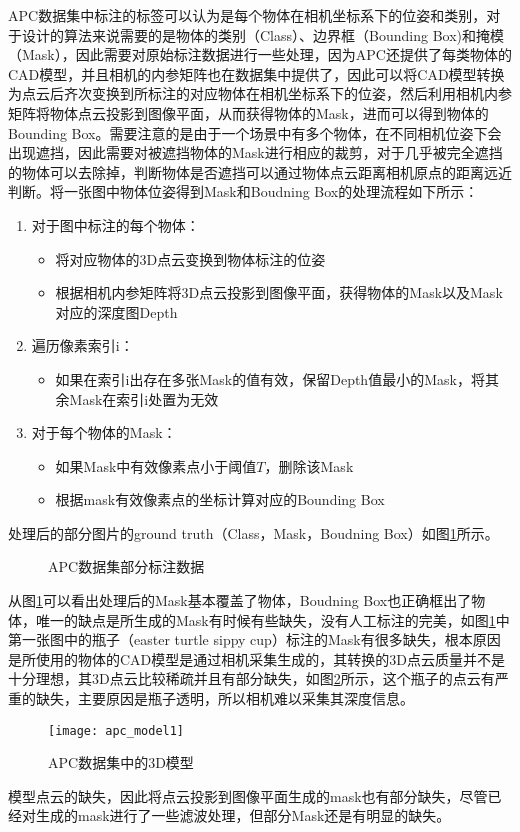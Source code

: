 APC数据集中标注的标签可以认为是每个物体在相机坐标系下的位姿和类别，对于设计的算法来说需要的是物体的类别（Class）、边界框（Bounding Box)和掩模（Mask），因此需要对原始标注数据进行一些处理，因为APC还提供了每类物体的CAD模型，并且相机的内参矩阵也在数据集中提供了，因此可以将CAD模型转换为点云后齐次变换到所标注的对应物体在相机坐标系下的位姿，然后利用相机内参矩阵将物体点云投影到图像平面，从而获得物体的Mask，进而可以得到物体的Bounding Box。需要注意的是由于一个场景中有多个物体，在不同相机位姿下会出现遮挡，因此需要对被遮挡物体的Mask进行相应的裁剪，对于几乎被完全遮挡的物体可以去除掉，判断物体是否遮挡可以通过物体点云距离相机原点的距离远近判断。将一张图中物体位姿得到Mask和Boudning Box的处理流程如下所示：
\begin{enumerate}
\item 对于图中标注的每个物体：
  \begin{itemize}
  \item 将对应物体的3D点云变换到物体标注的位姿
  \item 根据相机内参矩阵将3D点云投影到图像平面，获得物体的Mask以及Mask对应的深度图Depth
  \end{itemize}
\item 遍历像素索引i：
  \begin{itemize}
  \item 如果在索引i出存在多张Mask的值有效，保留Depth值最小的Mask，将其余Mask在索引i处置为无效
  \end{itemize}
\item 对于每个物体的Mask：
  \begin{itemize}
  \item 如果Mask中有效像素点小于阈值$T$，删除该Mask
  \item 根据mask有效像素点的坐标计算对应的Bounding Box
  \end{itemize}
\end{enumerate}
处理后的部分图片的ground truth（Class，Mask，Boudning Box）如图\ref{fig:apc_gt}所示。
\begin{figure}[ht]
  \centering
  \hskip1cm
  \vfill
  \hskip1cm
  \caption{APC数据集部分标注数据}
  \label{fig:apc_gt}
\end{figure}
从图\ref{fig:apc_gt}可以看出处理后的Mask基本覆盖了物体，Boudning Box也正确框出了物体，唯一的缺点是所生成的Mask有时候有些缺失，没有人工标注的完美，如图\ref{fig:apc_gt}中第一张图中的瓶子（easter turtle sippy cup）标注的Mask有很多缺失，根本原因是所使用的物体的CAD模型是通过相机采集生成的，其转换的3D点云质量并不是十分理想，其3D点云比较稀疏并且有部分缺失，如图\ref{fig:apc_model}所示，这个瓶子的点云有严重的缺失，主要原因是瓶子透明，所以相机难以采集其深度信息。
\begin{figure}[ht]
  \centering
  \texttt{[image: apc\_model1]}
  \caption{APC数据集中的3D模型}
  \label{fig:apc_model}
\end{figure}
模型点云的缺失，因此将点云投影到图像平面生成的mask也有部分缺失，尽管已经对生成的mask进行了一些滤波处理，但部分Mask还是有明显的缺失。


